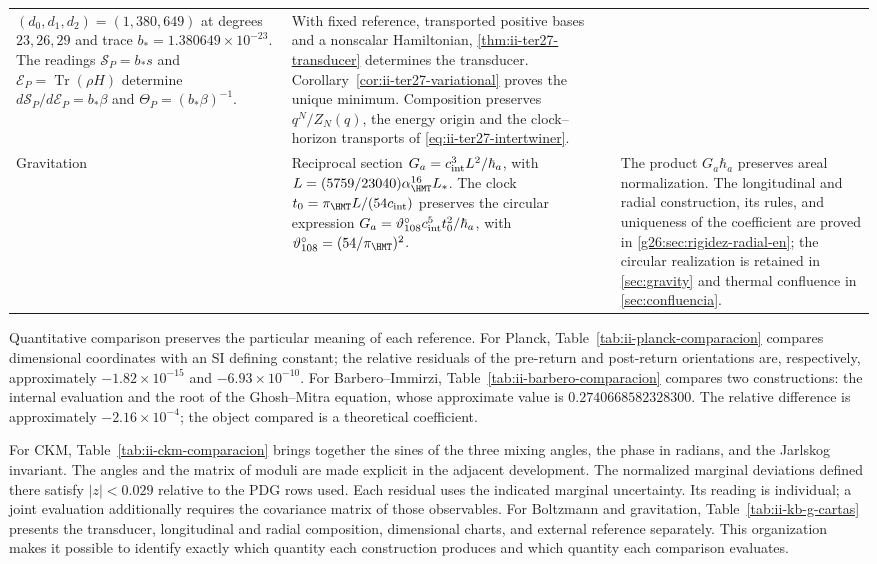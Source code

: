 \begin{longtable}{@{}p{.13\linewidth}p{.415\linewidth}p{.395\linewidth}@{}}
$(d_0,d_1,d_2)=(1,380,649)$ at degrees $23,26,29$ and trace
$b_*=1.380649\times10^{-23}$.
The readings $\mathcal S_P=b_*s$ and $\mathcal E_P=\operatorname{Tr}(\rho H)$
determine $d\mathcal S_P/d\mathcal E_P=b_*\beta$ and
$\Theta_P=(b_*\beta)^{-1}$.
& With fixed reference, transported positive bases and a nonscalar
Hamiltonian, \ref{thm:ii-ter27-transducer} determines the transducer.
Corollary~\ref{cor:ii-ter27-variational} proves the unique minimum.
Composition preserves $q^N/Z_N(q)$, the energy origin and the
clock--horizon transports of \eqref{eq:ii-ter27-intertwiner}.\\[5pt]
Gravitation & Reciprocal section
$G_a=c_{\rm int}^{3}L^2/\hbar_a$,
with $L=(5759/23040)\alpha_{\HMT}^{16}L_*$.
The clock $t_0=\pi_{\HMT}L/(54c_{\rm int})$ preserves the circular
expression $G_a=\vartheta_{108}^{\circ}c_{\rm int}^{5}t_0^2/\hbar_a$,
with $\vartheta_{108}^{\circ}=(54/\pi_{\HMT})^2$.
& The product $G_a\hbar_a$ preserves areal normalization.
The longitudinal and radial construction, its rules, and uniqueness
of the coefficient are proved in \ref{g26:sec:rigidez-radial-en};
the circular realization is retained in \ref{sec:gravity} and thermal confluence in
\ref{sec:confluencia}.\\
\end{longtable}
\endgroup

Quantitative comparison preserves the particular meaning of each
reference. For Planck, Table~\ref{tab:ii-planck-comparacion} compares
dimensional coordinates with an SI defining constant; the relative
residuals of the pre-return and post-return orientations are,
respectively, approximately $-1.82\times10^{-15}$ and
$-6.93\times10^{-10}$. For Barbero--Immirzi,
Table~\ref{tab:ii-barbero-comparacion} compares two constructions:
the internal evaluation and the root of the Ghosh--Mitra equation, whose
approximate value is $0.2740668582328300$. The relative difference is
approximately $-2.16\times10^{-4}$; the object compared is a
theoretical coefficient.

For CKM, Table~\ref{tab:ii-ckm-comparacion} brings together the sines of the
three mixing angles, the phase in radians, and the Jarlskog invariant.
The angles and the matrix of moduli are made explicit in the adjacent
development.
The normalized marginal deviations defined there satisfy
$|z|<0.029$ relative to the PDG rows used. Each residual uses
the indicated marginal uncertainty. Its reading is individual;
a joint evaluation additionally requires the covariance matrix
of those observables.
For Boltzmann and gravitation, Table~\ref{tab:ii-kb-g-cartas}
presents the transducer, longitudinal and radial composition, dimensional charts,
and external reference separately. This organization makes it possible
to identify exactly which quantity each construction produces and
which quantity each comparison evaluates.

